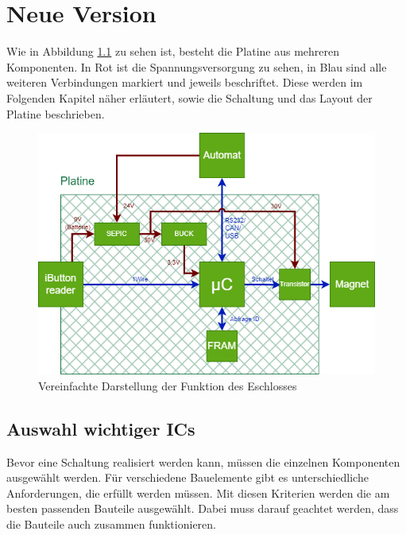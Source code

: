 
\chapter{Neue Version}
Wie in Abbildung \ref{fig:blockdiagramm} zu sehen ist, besteht die Platine aus mehreren Komponenten.
In Rot ist die Spannungsversorgung zu sehen, in Blau sind alle weiteren Verbindungen markiert und jeweils beschriftet.
Diese werden im Folgenden Kapitel näher erläutert, sowie die Schaltung und das Layout der Platine beschrieben.

\begin{figure}[H]
    \centering
    \includegraphics[width=1\textwidth]{resources/images/Blockdiagram.png}
    \caption[Blockdiagram]{Vereinfachte Darstellung der Funktion des Eschlosses}
    \label{fig:blockdiagramm}
\end{figure}

\section{Auswahl wichtiger \acp{IC}}
Bevor eine Schaltung realisiert werden kann, müssen die einzelnen Komponenten ausgewählt werden. Für verschiedene Bauelemente
gibt es unterschiedliche Anforderungen, die erfüllt werden müssen. Mit diesen Kriterien werden die am besten passenden
Bauteile ausgewählt. Dabei muss darauf geachtet werden, dass die Bauteile auch zusammen funktionieren.


